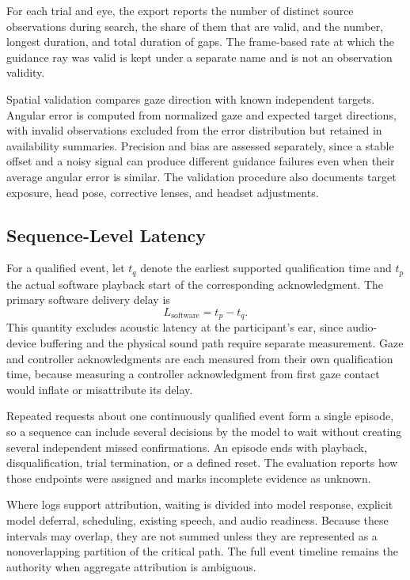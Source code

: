 For each trial and eye, the export reports the number of distinct source observations during search, the share of them that are valid, and the number, longest duration, and total duration of gaps. The frame-based rate at which the guidance ray was valid is kept under a separate name and is not an observation validity.

Spatial validation compares gaze direction with known independent targets. Angular error is computed from normalized gaze and expected target directions, with invalid observations excluded from the error distribution but retained in availability summaries. Precision and bias are assessed separately, since a stable offset and a noisy signal can produce different guidance failures even when their average angular error is similar. The validation procedure also documents target exposure, head pose, corrective lenses, and headset adjustments.

\subsection{Sequence-Level Latency}
\label{sec:sequence-latency}
For a qualified event, let $t_q$ denote the earliest supported qualification time and $t_p$ the actual software playback start of the corresponding acknowledgment. The primary software delivery delay is
\begin{equation}
L_{\mathrm{software}}=t_p-t_q.
\end{equation}
This quantity excludes acoustic latency at the participant's ear, since audio-device buffering and the physical sound path require separate measurement. Gaze and controller acknowledgments are each measured from their own qualification time, because measuring a controller acknowledgment from first gaze contact would inflate or misattribute its delay.

Repeated requests about one continuously qualified event form a single episode, so a sequence can include several decisions by the model to wait without creating several independent missed confirmations. An episode ends with playback, disqualification, trial termination, or a defined reset. The evaluation reports how those endpoints were assigned and marks incomplete evidence as unknown.

Where logs support attribution, waiting is divided into model response, explicit model deferral, scheduling, existing speech, and audio readiness. Because these intervals may overlap, they are not summed unless they are represented as a nonoverlapping partition of the critical path. The full event timeline remains the authority when aggregate attribution is ambiguous.

